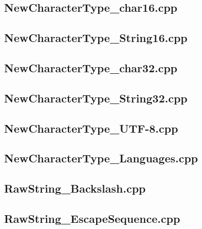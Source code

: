 \documentclass[11pt]{report}
\begin{document}
\begin{appendix}
\subsection{NewCharacterType\_char16.cpp}
\label{NewCharacterType_char16}


\subsection{NewCharacterType\_String16.cpp}
\label{NewCharacterType_String16}


\subsection{NewCharacterType\_char32.cpp}
\label{NewCharacterType_char32}


\subsection{NewCharacterType\_String32.cpp}
\label{NewCharacterType_String32}


\subsection{NewCharacterType\_UTF-8.cpp}
\label{NewCharacterType_UTF-8}


\subsection{NewCharacterType\_Languages.cpp}
\label{NewCharacterType_Languages}


\subsection{RawString\_Backslash.cpp}
\label{RawString_Backslash}


\subsection{RawString\_EscapeSequence.cpp}
\label{RawString_EscapeSequence}



\end{appendix}
\end{document}
